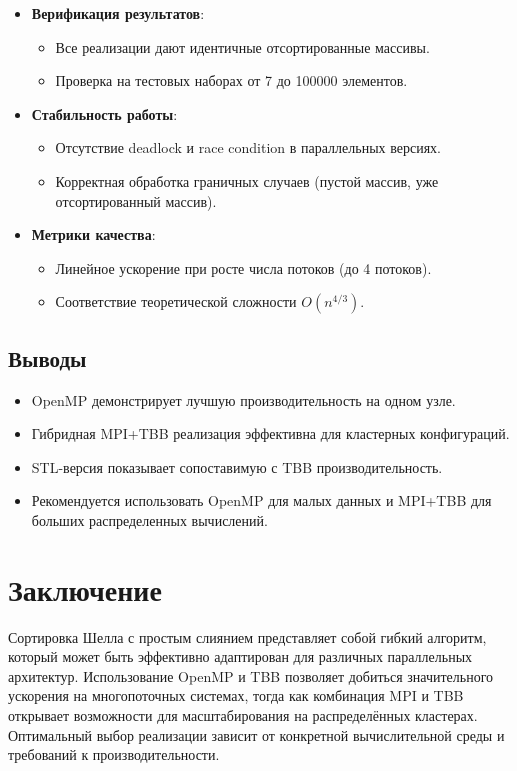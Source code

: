 \documentclass[a4paper,14pt]{extarticle}
\begin{document}
\begin{itemize}
    \item \textbf{Верификация результатов}:
    \begin{itemize}
        \item Все реализации дают идентичные отсортированные массивы.
        \item Проверка на тестовых наборах от 7 до 100000 элементов.
    \end{itemize}

    \item \textbf{Стабильность работы}:
    \begin{itemize}
        \item Отсутствие deadlock и race condition в параллельных версиях.
        \item Корректная обработка граничных случаев (пустой массив, уже отсортированный массив).
    \end{itemize}

    \item \textbf{Метрики качества}:
    \begin{itemize}
        \item Линейное ускорение при росте числа потоков (до 4 потоков).
        \item Соответствие теоретической сложности $O(n^{4/3})$.
    \end{itemize}
\end{itemize}

\subsection*{Выводы}

\begin{itemize}
    \item OpenMP демонстрирует лучшую производительность на одном узле.
    \item Гибридная MPI+TBB реализация эффективна для кластерных конфигураций.
    \item STL-версия показывает сопоставимую с TBB производительность.
    \item Рекомендуется использовать OpenMP для малых данных и MPI+TBB для больших распределенных вычислений.
\end{itemize}

\newpage

\section*{Заключение}
Сортировка Шелла с простым слиянием представляет собой гибкий алгоритм, который может быть эффективно адаптирован для различных параллельных архитектур. Использование OpenMP и TBB позволяет добиться значительного ускорения на многопоточных системах, тогда как комбинация MPI и TBB открывает возможности для масштабирования на распределённых кластерах. Оптимальный выбор реализации зависит от конкретной вычислительной среды и требований к производительности.
\end{document}
